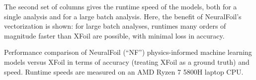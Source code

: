 \documentclass[conf]{new-aiaa}
\begin{document}
    The second set of columns gives the runtime speed of the models, both for a single analysis and for a large batch analysis. Here, the benefit of NeuralFoil's vectorization is shown: for large batch analyses, runtimes many orders of magnitude faster than XFoil are possible, with minimal loss in accuracy.

    \begin{table}[h]
        \centering
        \caption{Performance comparison of NeuralFoil (``NF'') physics-informed machine learning models versus XFoil in terms of accuracy (treating XFoil as a ground truth) and speed. Runtime speeds are measured on an AMD Ryzen 7 5800H laptop CPU.}
        \label{tab:neuralfoil_performance}

        \begin{adjustbox}{width=\textwidth}


\end{adjustbox}
\end{table}
\end{document}
